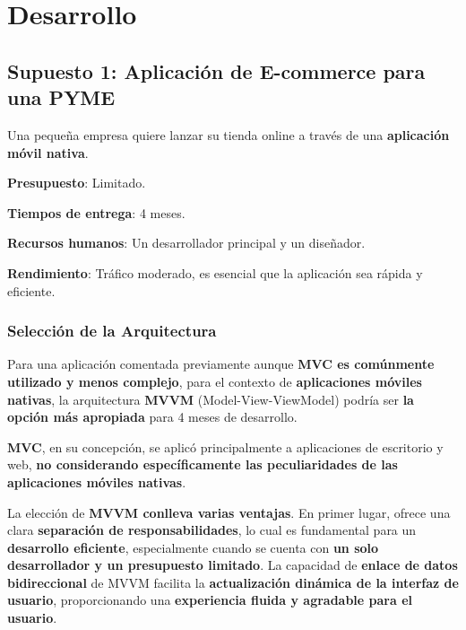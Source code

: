 \documentclass[a4paper]{article}
\begin{document}
    \section{Desarrollo} 
    
    \subsection{Supuesto 1: Aplicación de E-commerce para una PYME}
    
    Una pequeña empresa quiere lanzar su tienda online a través de una \textbf{aplicación móvil nativa}.\vspace{0.2cm}
    
    \textbf{Presupuesto}: Limitado.\vspace{0.2cm}
    
    \textbf{Tiempos de entrega}: 4 meses.\vspace{0.2cm}
    
    \textbf{Recursos humanos}: Un desarrollador principal y un diseñador.\vspace{0.2cm}
    
    \textbf{Rendimiento}: Tráfico moderado, es esencial que la aplicación sea rápida y eficiente.\vspace{0.2cm}

    \subsubsection{Selección de la Arquitectura}
    
    Para una aplicación comentada previamente aunque \textbf{MVC es comúnmente utilizado y menos complejo}, para el contexto de \textbf{aplicaciones móviles nativas}, la arquitectura \textbf{MVVM} (Model-View-ViewModel) podría ser \textbf{la opción más apropiada} para 4 meses de desarrollo.\vspace{0.3cm}

    \textbf{MVC}, en su concepción, se aplicó principalmente a aplicaciones de escritorio y web, \textbf{no considerando específicamente las peculiaridades de las aplicaciones móviles nativas}.\vspace{0.3cm}
    
    La elección de \textbf{MVVM conlleva varias ventajas}. En primer lugar, ofrece una clara \textbf{separación de responsabilidades}, lo cual es fundamental para un \textbf{desarrollo eficiente}, especialmente cuando se cuenta con \textbf{un solo desarrollador y un presupuesto limitado}. La capacidad de \textbf{enlace de datos bidireccional} de MVVM facilita la \textbf{actualización dinámica de la interfaz de usuario}, proporcionando una \textbf{experiencia fluida y agradable para el usuario}.\vspace{0.3cm}
    
\end{document}
